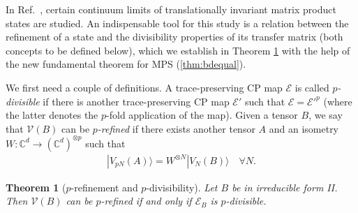 \documentclass[pra,a4paper,notitlepage,nofootinbib,superscriptaddress]{revtex4-1}
\theoremstyle{plain}
\newtheorem{theorem}[lemma]{Theorem}
\newcommand{\E}{\mathcal{E}}
\newcommand{\1}{{\openone}}
\newcommand{\be}{\begin{eqnarray}}
\newcommand{\ee}{\end{eqnarray}}
\newcommand{\ra}{\rangle}
\newcommand{\mc}{\mathcal}
\begin{document}
In Ref.~\cite{De16}, certain continuum limits of translationally invariant
matrix product states are studied.  An indispensable tool for this study
is a relation between the refinement of a state  and the divisibility
properties of its transfer matrix (both concepts to be defined below),
which we establish in Theorem  \ref{thm:div} with the help of the new
fundamental theorem for MPS  (\cref{thm:bdequal}).

We first need a couple of  definitions.
A trace-preserving CP map
$\E$ is called \emph{$p$-divisible} if there is another trace-preserving CP map $\E'$ such that $\E= \E'^p$ (where the latter denotes the $p$-fold application of the map).
Given a tensor $B$, we say that  $\mc{V}(B)$ can be \emph{$p$-refined} if there exists another tensor $A$ and an isometry
$W:\mathbb{C}^d\to (\mathbb{C}^d)^{\otimes p}$
such that
\be
    |V_{pN}(A)\ra = W^{\otimes N}|V_N(B)\ra \quad \forall N .
    \label{eq:fine}
\ee


\begin{theorem}[$p$-refinement and $p$-divisibility]
    \label{thm:div}
    Let $B$ be in irreducible form II.
    Then $\mc{V}(B)$ can be $p$-refined if and only if $\E_B$ is $p$-divisible.
\end{theorem}
\end{document}
